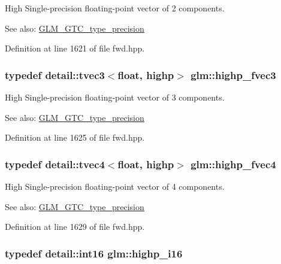 High Single-precision floating-point vector of 2 components. \begin{Desc}
\item[See also:]\hyperlink{group__gtc__type__precision}{GLM\_\-GTC\_\-type\_\-precision} \end{Desc}


Definition at line 1621 of file fwd.hpp.\hypertarget{group__gtc__type__precision_g79b821fc8ae989b12bb43e2cd3932580}{
\subsubsection[highp\_\-fvec3]{\setlength{\rightskip}{0pt plus 5cm}typedef detail::tvec3$<$float, highp$>$ {\bf glm::highp\_\-fvec3}}}
\label{group__gtc__type__precision_g79b821fc8ae989b12bb43e2cd3932580}


High Single-precision floating-point vector of 3 components. \begin{Desc}
\item[See also:]\hyperlink{group__gtc__type__precision}{GLM\_\-GTC\_\-type\_\-precision} \end{Desc}


Definition at line 1625 of file fwd.hpp.\hypertarget{group__gtc__type__precision_ge0de2413648d89bf5a8e598e5520a439}{
\subsubsection[highp\_\-fvec4]{\setlength{\rightskip}{0pt plus 5cm}typedef detail::tvec4$<$float, highp$>$ {\bf glm::highp\_\-fvec4}}}
\label{group__gtc__type__precision_ge0de2413648d89bf5a8e598e5520a439}


High Single-precision floating-point vector of 4 components. \begin{Desc}
\item[See also:]\hyperlink{group__gtc__type__precision}{GLM\_\-GTC\_\-type\_\-precision} \end{Desc}


Definition at line 1629 of file fwd.hpp.\hypertarget{group__gtc__type__precision_ga04399853952dbce29cb62e2432f350a}{
\subsubsection[highp\_\-i16]{\setlength{\rightskip}{0pt plus 5cm}typedef detail::int16 {\bf glm::highp\_\-i16}}}
\label{group__gtc__type__precision_ga04399853952dbce29cb62e2432f350a}


